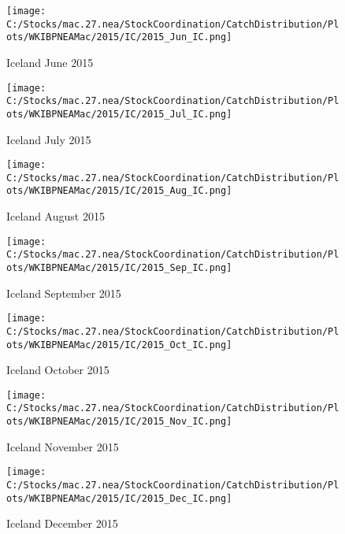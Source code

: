 \documentclass{article}
\begin{document}
\begin{figure}
	\centering
		\texttt{[image: C:/Stocks/mac.27.nea/StockCoordination/CatchDistribution/Plots/WKIBPNEAMac/2015/IC/2015\_Jun\_IC.png]}
	\caption{Iceland June 2015}
	\label{fig:2015_Jun_IC}
\end{figure}

\begin{figure}
	\centering
		\texttt{[image: C:/Stocks/mac.27.nea/StockCoordination/CatchDistribution/Plots/WKIBPNEAMac/2015/IC/2015\_Jul\_IC.png]}
	\caption{Iceland July 2015}
	\label{fig:2015_Jul_IC}
\end{figure}

\begin{figure}
	\centering
		\texttt{[image: C:/Stocks/mac.27.nea/StockCoordination/CatchDistribution/Plots/WKIBPNEAMac/2015/IC/2015\_Aug\_IC.png]}
	\caption{Iceland August 2015}
	\label{fig:2015_Aug_IC}
\end{figure}

\begin{figure}
	\centering
		\texttt{[image: C:/Stocks/mac.27.nea/StockCoordination/CatchDistribution/Plots/WKIBPNEAMac/2015/IC/2015\_Sep\_IC.png]}
	\caption{Iceland September 2015}
	\label{fig:2015_Sep_IC}
\end{figure}

\begin{figure}
	\centering
		\texttt{[image: C:/Stocks/mac.27.nea/StockCoordination/CatchDistribution/Plots/WKIBPNEAMac/2015/IC/2015\_Oct\_IC.png]}
	\caption{Iceland October 2015}
	\label{fig:2015_Oct_IC}
\end{figure}

\begin{figure}
	\centering
		\texttt{[image: C:/Stocks/mac.27.nea/StockCoordination/CatchDistribution/Plots/WKIBPNEAMac/2015/IC/2015\_Nov\_IC.png]}
	\caption{Iceland November 2015}
	\label{fig:2015_Nov_IC}
\end{figure}

\begin{figure}
	\centering
		\texttt{[image: C:/Stocks/mac.27.nea/StockCoordination/CatchDistribution/Plots/WKIBPNEAMac/2015/IC/2015\_Dec\_IC.png]}
	\caption{Iceland December 2015}
	\label{fig:2015_Dec_IC}
\end{figure}

\clearpage

\newpage
\end{document}
